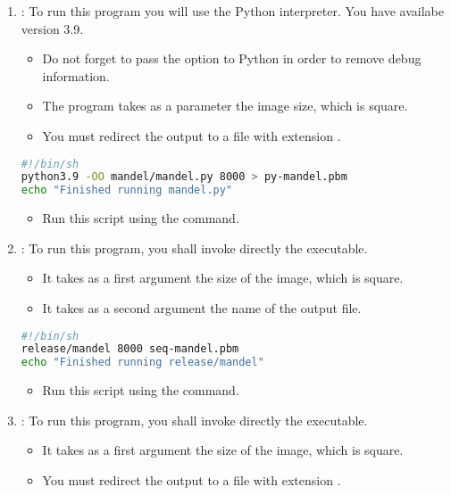 \begin{enumerate}
  \item {}: 
        To run this program you will use the Python interpreter.
        You have availabe version 3.9.

    \begin{itemize}
      \item Do not forget to pass the option  to Python in order
            to remove debug information.
      \item The program takes as a parameter the image size, which is square.
      \item You must redirect the output to a file with extension .
    \end{itemize}

\begin{lstlisting}[language=bash,title={File: runpy.sh},frame=single]
#!/bin/sh
python3.9 -OO mandel/mandel.py 8000 > py-mandel.pbm
echo "Finished running mandel.py"
\end{lstlisting}

    \begin{itemize}
      \item Run this script using the  command.
    \end{itemize}

  \item {}: 
        To run this program, you shall invoke directly the executable.
    \begin{itemize}
      \item It takes as a first argument the size of the image, which is square.
      \item It takes as a second argument the name of the output file.
    \end{itemize}

\begin{lstlisting}[language=bash,title={File: run-seq-mandel.sh},frame=single]
#!/bin/sh
release/mandel 8000 seq-mandel.pbm
echo "Finished running release/mandel"
\end{lstlisting}
    \begin{itemize}
      \item Run this script using the  command.
    \end{itemize}

  \item {}: 
        To run this program, you shall invoke directly the executable.
    \begin{itemize}
      \item It takes as a first argument the size of the image, which is square.
      \item You must redirect the output to a file with extension .
    \end{itemize}


\end{enumerate}
